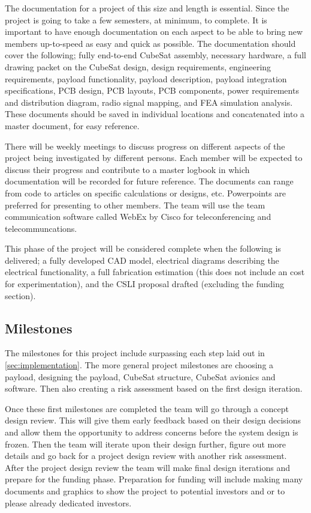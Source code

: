 \documentclass[conference]{IEEEtran} %
\begin{document}
The documentation for a project of this size and length is essential. Since the project is going to take a few semesters, at minimum, to complete. It is important
to have enough documentation on each aspect to be able to bring new members up-to-speed as easy and quick as possible. The documentation should cover the following; fully end-to-end CubeSat assembly,
necessary hardware, a full drawing packet on the CubeSat design, design requirements, engineering requirements, payload functionality, payload description, payload integration specifications, PCB design,
PCB layouts, PCB components, power requirements and distribution diagram, radio signal mapping, and FEA simulation analysis. These documents should be saved in individual locations
and concatenated into a master document, for easy reference.

There will be weekly meetings to discuss progress on different aspects of the project being investigated by different persons. Each member will be expected to discuss
their progress and contribute to a master logbook in which documentation will be recorded for future reference. The documents can range from code to articles on specific calculations
or designs, etc. Powerpoints are preferred for presenting to other members. The team will use the team communication software called WebEx by Cisco for teleconferencing and telecommuncations.

This phase of the project will be considered complete when the following is delivered; a fully developed CAD model, electrical diagrams describing the electrical functionality,
 a full fabrication estimation (this does not include an cost for experimentation), and the CSLI proposal drafted (excluding the funding section).

\subsection{Milestones}
\label{subsec:milestones}
The milestones for this project include surpassing each step laid out in \autoref{sec:implementation}. The more general project milestones are choosing a payload,
designing the payload, CubeSat structure, CubeSat avionics and software. Then also creating a risk assessment based on the first design iteration.

Once these first milestones are completed the team will go through a concept design review. This will give them early feedback based on their design decisions and
allow them the opportunity to address concerns before the system design is frozen. Then the team will iterate upon their design further, figure out more details and
go back for a project design review with another risk assessment. After the project design review the team will make final design iterations and prepare for the funding phase.
Preparation for funding will include making many documents and graphics to show the project to potential investors and or to please already dedicated investors.
\end{document}
